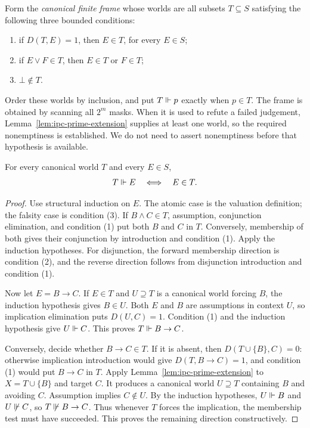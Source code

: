 Form the \emph{canonical finite frame} whose worlds are all subsets
$T\subseteq S$ satisfying the following three bounded conditions:
\begin{enumerate}
\item if $D(T,E)=1$, then $E\in T$, for every $E\in S$;
\item if $E\vee F\in T$, then $E\in T$ or $F\in T$;
\item $\bot\notin T$.
\end{enumerate}
Order these worlds by inclusion, and put $T\Vdash p$ exactly when $p\in T$.
The frame is obtained by scanning all $2^m$ masks. When it is used to
refute a failed judgement, Lemma~\ref{lem:ipc-prime-extension} supplies at
least one world, so the required nonemptiness is established. We do not
need to assert nonemptiness before that hypothesis is available.

\begin{theorem}
\label{thm:ipc-truth-lemma}
For every canonical world $T$ and every $E\in S$,
\[
                      T\Vdash E\quad\Longleftrightarrow\quad E\in T.
\]
\end{theorem}
\begin{proof}
Use structural induction on $E$. The atomic case is the valuation definition;
the falsity case is condition (3). If $B\wedge C\in T$, assumption,
conjunction elimination, and condition (1) put both $B$ and $C$ in $T$.
Conversely, membership of both gives their conjunction by introduction and
condition (1). Apply the induction hypotheses. For disjunction, the forward
membership direction is condition (2), and the reverse direction follows
from disjunction introduction and condition (1).

Now let $E=B\to C$. If $E\in T$ and $U\supseteq T$ is a canonical world
forcing $B$, the induction hypothesis gives $B\in U$. Both $E$ and $B$
are assumptions in context $U$, so implication elimination puts $D(U,C)=1$.
Condition (1) and the induction hypothesis give $U\Vdash C$. This proves
$T\Vdash B\to C$.

Conversely, decide whether $B\to C\in T$. If it is absent, then
$D(T\cup\{B\},C)=0$: otherwise implication introduction would give
$D(T,B\to C)=1$, and condition (1) would put $B\to C$ in $T$.
Apply Lemma~\ref{lem:ipc-prime-extension} to $X=T\cup\{B\}$ and target $C$.
It produces a canonical world $U\supseteq T$ containing $B$ and avoiding
$C$. Assumption implies $C\notin U$. By the induction hypotheses,
$U\Vdash B$ and $U\not\Vdash C$, so $T\not\Vdash B\to C$.
Thus whenever $T$ forces the implication, the membership test must have
succeeded. This proves the remaining direction constructively.
\end{proof}

